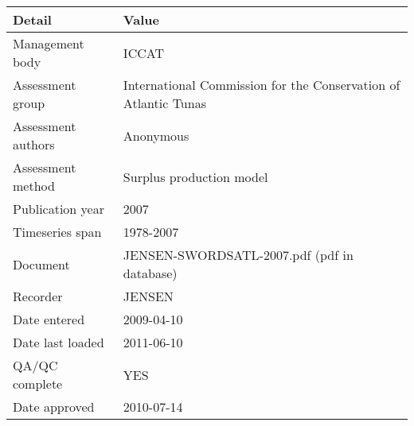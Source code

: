 \begin{table}[htb]
\centering
\begin{tabular}{lp{7cm}}
\toprule
Detail & Value \\
\midrule
Management body    & ICCAT                                                           \\
Assessment group   & International Commission for the Conservation of Atlantic Tunas \\
Assessment authors & Anonymous                                                       \\
Assessment method  & Surplus production model                                        \\
Publication year   & 2007                                                            \\
Timeseries span    & 1978-2007                                                       \\
Document           & JENSEN-SWORDSATL-2007.pdf (pdf in database)                     \\
Recorder           & JENSEN                                                          \\
Date entered       & 2009-04-10                                                      \\
Date last loaded   & 2011-06-10                                                      \\
QA/QC complete     & YES                                                             \\
Date approved      & 2010-07-14                                                      \\
\bottomrule
\end{tabular}
\label{tab:assessdet}
\end{table}
